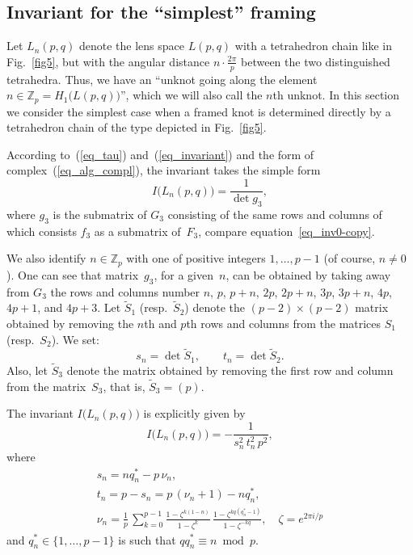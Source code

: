\documentclass[pdftex]{sigma}
\begin{document}
\subsection[Invariant for the ''simplest'' framing]{Invariant for the ``simplest'' framing}
\label{subsec_lens_calculation}

Let $L_n(p,q)$ denote the lens space $L(p,q)$ with a tetrahedron chain like in Fig.~\ref{fig5}, but with the angular distance $n\cdot\frac{2\pi}{p}$ between the two distinguished tetrahedra. Thus, we have an ``unknot going along the element $n\in\mathbb Z_p = H_1 \bigl(L(p,q)\bigr)$'', which we will also call the $n$th unknot. In this section we consider the simplest case when a framed knot is determined directly by a tetrahedron chain of the type depicted in Fig.~\ref{fig5}.

According to~(\ref{eq_tau}) and~(\ref{eq_invariant}) and the form of complex~(\ref{eq_alg_compl}), the invariant takes the simple form
\begin{equation}
I\bigl(L_n(p,q)\bigr) = \frac{1}{\det g_3},
\label{eq_inv0}
\end{equation}
where $g_3$ is the submatrix of $G_3$ consisting of the same rows and columns of which consists $f_3$ as a submatrix of~$F_3$, compare equation~\eqref{eq_inv0-copy}.

We also identify $n\in \mathbb Z_p$ with one of positive integers $1,\ldots,p-1$ (of course, $n\ne0$). One can see that matrix~$g_3$, for a given~$n$, can be obtained by taking away from $G_3$ the rows and columns number $n$, $p$, $p+n$, $2p$, $2p+n$, $3p$, $3p+n$, $4p$, $4p+1$, and $4p+3$. Let $\widetilde S_1$ (resp.~$\widetilde S_2$) denote the $(p-2)\times (p-2)$ matrix obtained by removing the $n$th and $p$th rows and columns from the matrices $S_1$ (resp.~$S_2$). We set:
\begin{displaymath}
s_n = \det \widetilde S_1,\qquad t_n=\det \widetilde S_2.
\end{displaymath}
Also, let $\widetilde S_3$ denote the matrix obtained by removing the f\/irst row and column from the matrix~$S_3$, that is, $\widetilde S_3 = (p)$.

\begin{theorem}
\label{th_sntn} The invariant $I\bigl(L_n(p,q)\bigr)$ is explicitly given by
\begin{equation}
I\bigl(L_n(p,q)\bigr) = - \frac{1}{s_n^2 \, t_n^2 \, p^2} \label{eq_In},
\end{equation}
where
\begin{gather}
s_n = n q^*_n - p \, \nu_n, \label{eq_sn}
\\
t_n = p - s_n = p \, (\nu_n + 1) - n q^*_n, \label{eq_tn}
\\
\nu_n = \frac{1}{p} \, \sum\limits_{k = 0}^{p-1} \frac{1 - \zeta^{k(1-n)}}{1 - \zeta^k} \, \frac{1 - \zeta^{kq(q^*_n-1)}}{1 - \zeta^{-kq}}, \quad \zeta = e^{2\pi i/p}
\label{eq_nun}
\end{gather}
and $q^*_n \in \{1, \ldots, p-1\}$ is such that $q q^*_n \equiv n \bmod p$.
\end{theorem}
\end{document}
